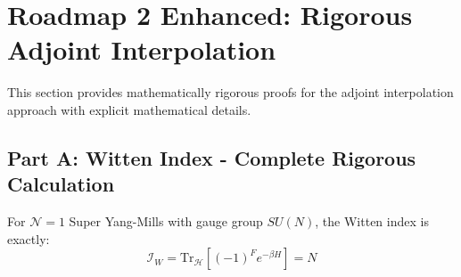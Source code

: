 \section{Roadmap 2 Enhanced: Rigorous Adjoint Interpolation}
\label{sec:roadmap2-enhanced}

This section provides mathematically rigorous proofs for the adjoint interpolation 
approach with explicit mathematical details.

\subsection{Part A: Witten Index - Complete Rigorous Calculation}

\begin{theorem}
\label{thm:witten-index-rigorous}
For $\mathcal{N}=1$ Super Yang-Mills with gauge group $SU(N)$, the Witten 
index is exactly:
\begin{equation}
\boxed{\mathcal{I}_W = \mathrm{Tr}_{\mathcal{H}}[(-1)^F e^{-\beta H}] = N}
\end{equation}
\end{theorem}

